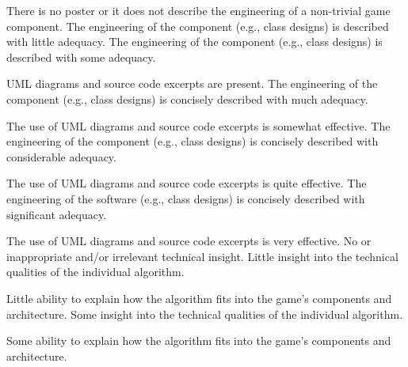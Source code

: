\documentclass{../../fal_assignment}
\begin{document}
\begin{markingrubric}
%
        \grade\fail There is no poster or it does not describe the engineering of a non-trivial game component. 
        \grade The engineering of the component (e.g., class designs) is described with little adequacy.
        \grade The engineering of the component (e.g., class designs) is described with some adequacy.
            \par UML diagrams and source code excerpts are present.
        \grade The engineering of the component (e.g., class designs) is concisely described with much adequacy.
            \par The use of UML diagrams and source code excerpts is somewhat effective.
        \grade The engineering of the component (e.g., class designs) is concisely described with considerable adequacy.
            \par The use of UML diagrams and source code excerpts is quite effective.
        \grade The engineering of the software (e.g., class designs) is concisely described with significant adequacy.
            \par The use of UML diagrams and source code excerpts is very effective.
%
        \grade\fail No or inappropriate and/or irrelevant technical insight.
        \grade Little insight into the technical qualities of the individual algorithm.
            \par Little ability to explain how the algorithm fits into the game's components and architecture.
        \grade Some insight into the technical qualities of the individual algorithm.
            \par Some ability to explain how the algorithm fits into the game's components and architecture.

\end{markingrubric}
\end{document}
